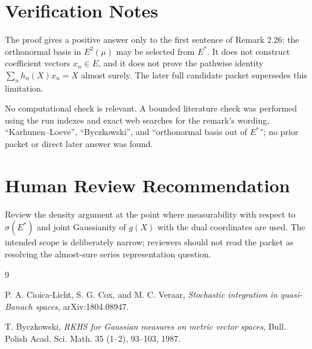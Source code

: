 \documentclass[11pt]{article}
\begin{document}
\section*{Verification Notes}

The proof gives a positive answer only to the first sentence of Remark 2.26:
the orthonormal basis in \(E^2(\mu)\) may be selected from \(E^*\). It does not
construct coefficient vectors \(x_n\in E\), and it does not prove the pathwise
identity \(\sum_n h_n(X)x_n=X\) almost surely. The later full candidate packet
supersedes this limitation.

No computational check is relevant. A bounded literature check was performed
using the run indexes and exact web searches for the remark's wording,
``Karhunen--Loeve'', ``Byczkowski'', and ``orthonormal basis out of \(E^*\)'';
no prior packet or direct later answer was found.

\section*{Human Review Recommendation}

Review the density argument at the point where measurability with respect to
\(\sigma(E^*)\) and joint Gaussianity of \(g(X)\) with the dual coordinates
are used. The intended scope is deliberately narrow; reviewers should not read
the packet as resolving the almost-sure series representation question.

\begin{thebibliography}{9}

P. A. Cioica-Licht, S. G. Cox, and M. C. Veraar,
\emph{Stochastic integration in quasi-Banach spaces},
arXiv:1804.08947.

T. Byczkowski,
\emph{RKHS for Gaussian measures on metric vector spaces},
Bull. Polish Acad. Sci. Math. 35 (1--2), 93--103, 1987.

\end{thebibliography}
\end{document}
